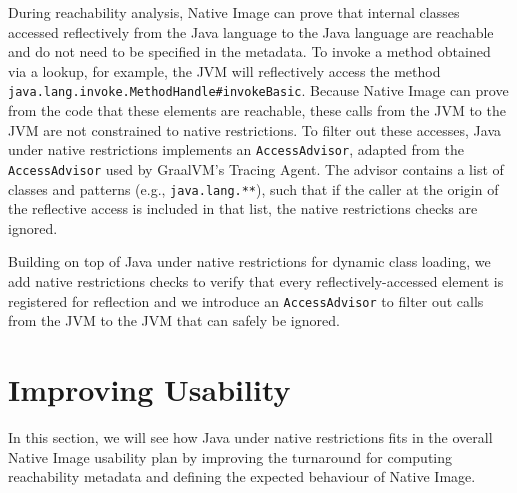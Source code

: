 During reachability analysis, Native Image can prove that internal classes accessed reflectively from the Java language to the Java language are reachable and do not need to be specified in the metadata. 
To invoke a method obtained via a lookup, for example, the JVM will reflectively access the method \verb|java.lang.invoke.MethodHandle#invokeBasic|. Because Native Image can prove from the code that these elements are reachable, these calls from the JVM to the JVM are not constrained to native restrictions. To filter out these accesses, Java under native restrictions implements an \verb|AccessAdvisor|, adapted from the \verb|AccessAdvisor| used by GraalVM's Tracing Agent. The advisor contains a list of classes and patterns (e.g., \verb|java.lang.**|), such that if the caller at the origin of the reflective access is included in that list, the native restrictions checks are ignored.

Building on top of Java under native restrictions for dynamic class loading, we add native restrictions checks to verify that every reflectively-accessed element is registered for reflection and we introduce an \verb|AccessAdvisor| to filter out calls from the JVM to the JVM that can safely be ignored.

\section{Improving Usability}
In this section, we will see how Java under native restrictions fits in the overall Native Image usability plan by improving the turnaround for computing reachability metadata and defining the expected behaviour of Native Image. 

